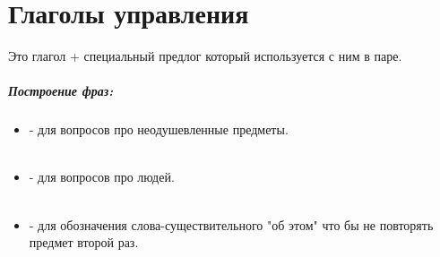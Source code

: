\chapter{Глаголы управления}

Это глагол + специальный предлог который используется с ним в паре.

\paragraph{Построение фраз:}
\begin{itemize}
 \item {} - для вопросов про неодушевленные предметы.
 ~\\ 
 ~\\ 
 \item {} - для вопросов про людей.
 ~\\ 
 ~\\ 
 \item {} - для обозначения слова-существительного "об этом" что бы не повторять предмет второй раз.
 ~\\ 
\end{itemize}

